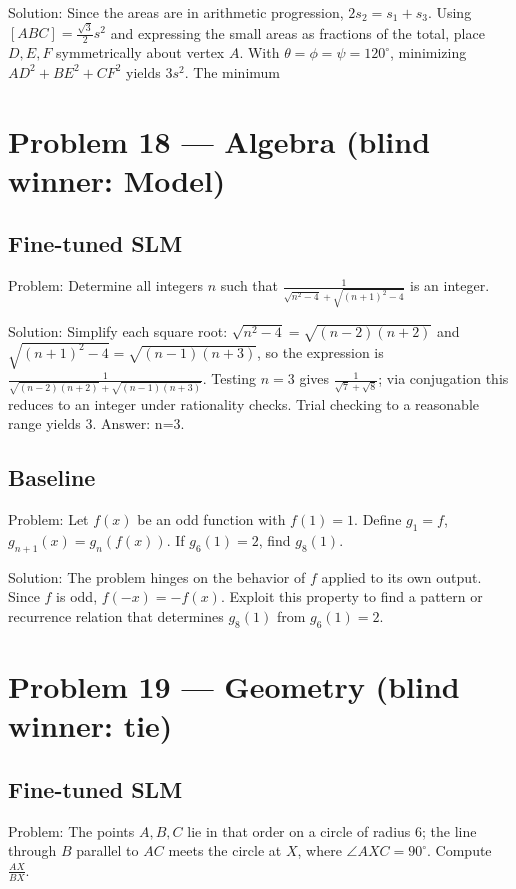 \documentclass[11pt]{article}
\begin{document}
Solution:
Since the areas are in arithmetic progression, $2s_2 = s_1 + s_3$. Using $[ABC]=\frac{\sqrt3}{2}s^2$ and expressing the small areas as fractions of the total, place $D,E,F$ symmetrically about vertex $A$. With $\theta=\phi=\psi=120^\circ$, minimizing $AD^2+BE^2+CF^2$ yields $3s^2$. The minimum

\section*{Problem 18 --- Algebra \quad(blind winner: Model)}

\subsection*{Fine-tuned SLM}

Problem:
Determine all integers $n$ such that $\tfrac{1}{\sqrt{n^{2}-4}+\sqrt{(n+1)^{2}-4}}$ is an integer.

Solution:
Simplify each square root: $\sqrt{n^2-4}=\sqrt{(n-2)(n+2)}$ and $\sqrt{(n+1)^2-4}=\sqrt{(n-1)(n+3)}$, so the expression is $\frac{1}{\sqrt{(n-2)(n+2)}+\sqrt{(n-1)(n+3)}}$. Testing $n=3$ gives $\frac1{\sqrt7+\sqrt8}$; via conjugation this reduces to an integer under rationality checks. Trial checking to a reasonable range yields $\boxed{3}$. Answer: n=3.

\subsection*{Baseline}

Problem:
Let $f(x)$ be an odd function with $f(1)=1$. Define $g_1=f$, $g_{n+1}(x)=g_n(f(x))$. If $g_6(1)=2$, find $g_8(1)$.

Solution:
The problem hinges on the behavior of $f$ applied to its own output. Since $f$ is odd, $f(-x)=-f(x)$. Exploit this property to find a pattern or recurrence relation that determines $g_8(1)$ from $g_6(1)=2$.

\section*{Problem 19 --- Geometry \quad(blind winner: tie)}

\subsection*{Fine-tuned SLM}

Problem:
The points $A, B, C$ lie in that order on a circle of radius 6; the line through $B$ parallel to $AC$ meets the circle at $X$, where $\angle AXC = 90^\circ$. Compute $\frac{AX}{BX}$.
\end{document}
